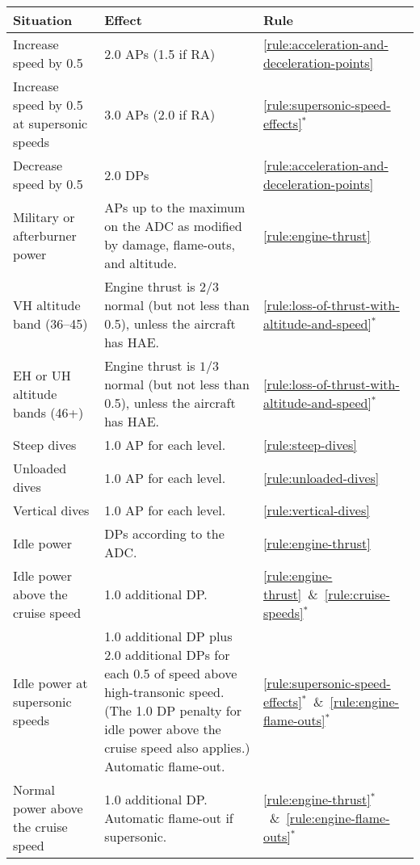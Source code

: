 {}{

\begin{twocolumntablefloat}[tp]
\begin{twocolumntable}


\begin{tabularx}{0.9\linewidth}{lLl}
\toprule
Situation&Effect&Rule\\
\midrule
\addlinespace
Increase speed by 0.5&2.0 APs (1.5 if RA)&\mbox{\ref{rule:acceleration-and-deceleration-points}}\\
Increase speed by 0.5 at supersonic speeds&3.0 APs (2.0 if RA)&\mbox{\ref{rule:supersonic-speed-effects}$^*$}\\
Decrease speed by 0.5&2.0 DPs&\mbox{\ref{rule:acceleration-and-deceleration-points}}\\
\addlinespace
\midrule
\addlinespace
Military or afterburner power&APs up to the maximum on the ADC as modified by damage, flame-outs, and altitude.&\mbox{\ref{rule:engine-thrust}}\\
VH altitude band (36--45)&Engine thrust is $2/3$ normal (but not less than 0.5), unless the aircraft has HAE.&\mbox{\ref{rule:loss-of-thrust-with-altitude-and-speed}$^*$}\\
EH or UH altitude bands (46+)&Engine thrust is $1/3$ normal (but not less than 0.5), unless the aircraft has HAE.&\mbox{\ref{rule:loss-of-thrust-with-altitude-and-speed}$^*$}\\
\addlinespace
Steep dives&1.0 AP for each level.&\mbox{\ref{rule:steep-dives}}\\
Unloaded dives&1.0 AP for each level.&\mbox{\ref{rule:unloaded-dives}}\\
Vertical dives&1.0 AP for each level.&\mbox{\ref{rule:vertical-dives}}\\
\addlinespace
\midrule
\addlinespace
Idle power&DPs according to the ADC.&\mbox{\ref{rule:engine-thrust}}\\
Idle power above the cruise speed&1.0 additional DP.&\mbox{\ref{rule:engine-thrust} \& \ref{rule:cruise-speeds}$^*$}\\
Idle power at supersonic speeds&1.0 additional DP plus 2.0 additional DPs for each 0.5 of speed above high-transonic speed. (The 1.0 DP penalty for idle power above the cruise speed also applies.) Automatic flame-out.&\mbox{\ref{rule:supersonic-speed-effects}$^*$ \& \ref{rule:engine-flame-outs}$^*$}\\
Normal power above the cruise speed&1.0 additional DP. Automatic flame-out if supersonic.&\mbox{\ref{rule:engine-thrust}$^*$ \& \ref{rule:engine-flame-outs}$^*$}\\

\end{tabularx}
\end{twocolumntable}
\end{twocolumntablefloat}}
